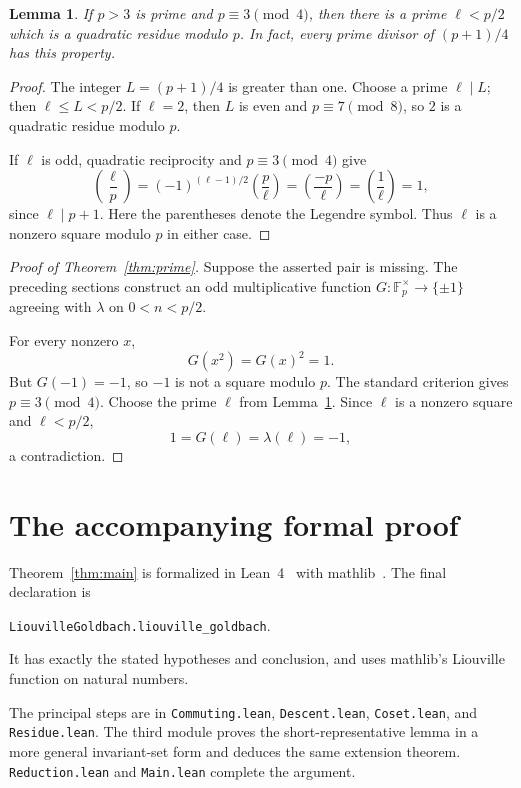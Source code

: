 \documentclass[11pt,a4paper]{article}
\newtheorem{lemma}[theorem]{Lemma}
\theoremstyle{remark}
\numberwithin{equation}{section}
\newcommand{\Fpx}{\mathbb F_p^{\times}}
\newcommand{\leg}[2]{\left(\frac{#1}{#2}\right)}
\newcommand{\lam}{\lambda}
\newcommand{\code}[1]{\texttt{#1}}
\begin{document}
\begin{lemma}\label{lem:small-prime}
If \(p>3\) is prime and \(p\equiv3\pmod4\), then there is a prime
\(\ell<p/2\) which is a quadratic residue modulo \(p\).
In fact, every prime divisor of \((p+1)/4\) has this property.
\end{lemma}

\begin{proof}
The integer \(L=(p+1)/4\) is greater than one. Choose a prime
\(\ell\mid L\); then \(\ell\le L<p/2\). If \(\ell=2\), then
\(L\) is even and \(p\equiv7\pmod8\), so \(2\) is a quadratic
residue modulo \(p\).

If \(\ell\) is odd, quadratic reciprocity and \(p\equiv3\pmod4\)
give
\[
  \leg{\ell}{p}
  =(-1)^{(\ell-1)/2}\leg{p}{\ell}
  =\leg{-p}{\ell}
  =\leg{1}{\ell}=1,
\]
since \(\ell\mid p+1\). Here the parentheses denote the Legendre
symbol. Thus \(\ell\) is a nonzero square modulo \(p\) in either case.
\end{proof}

\begin{proof}[Proof of Theorem~\ref{thm:prime}]
Suppose the asserted pair is missing. The preceding sections construct an
odd multiplicative function \(G:\Fpx\to\{\pm1\}\) agreeing with
\(\lam\) on \(0<n<p/2\).

For every nonzero \(x\),
\[
  G(x^2)=G(x)^2=1.
\]
But \(G(-1)=-1\), so \(-1\) is not a square modulo \(p\).
The standard criterion gives \(p\equiv3\pmod4\).
Choose the prime \(\ell\) from Lemma~\ref{lem:small-prime}. Since
\(\ell\) is a nonzero square and \(\ell<p/2\),
\[
  1=G(\ell)=\lam(\ell)=-1,
\]
a contradiction.
\end{proof}

\clearpage
\appendix
\section{The accompanying formal proof}\label{sec:lean}

Theorem~\ref{thm:main} is formalized in Lean~4~\cite{Lean4} with
mathlib~\cite{Mathlib}. The final declaration is
\begin{center}
\small\code{LiouvilleGoldbach.liouville\_goldbach}.
\end{center}
It has exactly the stated hypotheses and conclusion, and uses mathlib's
Liouville function on natural numbers.

The principal steps are in \code{Commuting.lean}, \code{Descent.lean},
\code{Coset.lean}, and \code{Residue.lean}. The third module proves the
short-representative lemma in a more general invariant-set form and
deduces the same extension theorem. \code{Reduction.lean} and
\code{Main.lean} complete the argument.
\end{document}
